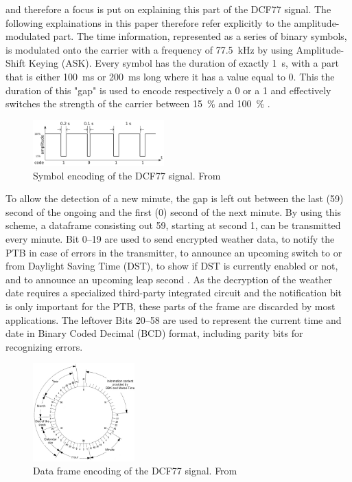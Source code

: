 \documentclass[conference]{IEEEtran}
\begin{document}
and therefore a focus is put on explaining this part of the DCF77 signal. The following explainations in this paper therefore refer explicitly to the amplitude-modulated part.
The time information, represented as a series of binary symbols, is modulated onto the carrier with a frequency of \SI{77.5}{\kilo\hertz} by using
Amplitude-Shift Keying (ASK). Every symbol has the duration of exactly \SI{1}{\second}, with a part that is either \SI{100}{\milli\second} or \SI{200}{\milli\second}
long where it has a value equal to 0.
This the duration of this "gap" is used to encode respectively a 0 or a 1 and effectively switches the strength of the carrier between \SI{15}{\percent} and \SI{100}{\percent} \cite{b5}.
\begin{figure}[htbp]
    \centerline{\includegraphics[width=0.45\textwidth]{img/dcf77_symbol_encoding.png}}
    \caption{Symbol encoding of the DCF77 signal. From \cite{b1}}
    \label{fig:dcf77_symbol_encoding}
\end{figure}
\FloatBarrier\noindent
To allow the detection of a new minute, the gap is left out between the last (59) second of the ongoing and the first (0) second of the next minute.
By using this scheme, a dataframe consisting out \SI{59}{\Bit}, starting at second 1, can be transmitted every minute.
Bit \SIrange{0}{19}{} are used to send encrypted weather data, to notify the PTB in case of errors in the transmitter, to announce an upcoming
switch to or from Daylight Saving Time (DST), to show if DST is currently enabled or not, and to announce an upcoming leap second \cite{b5}.
As the decryption of the weather date requires a specialized third-party integrated circuit and the notification bit is only important for the PTB, these parts
of the frame are discarded by most applications.
The leftover Bits \SIrange{20}{58}{} are used to represent the current time and date in Binary Coded Decimal (BCD) format, including parity bits for recognizing errors.
\begin{figure}[htbp]
    \centerline{\includegraphics[width=0.35\textwidth]{img/dcf77_frame_encoding.jpg}}
    \caption{Data frame encoding of the DCF77 signal. From \cite{b5}}
    \label{fig:dcf77_data_encoding}
\end{figure}
\end{document}
